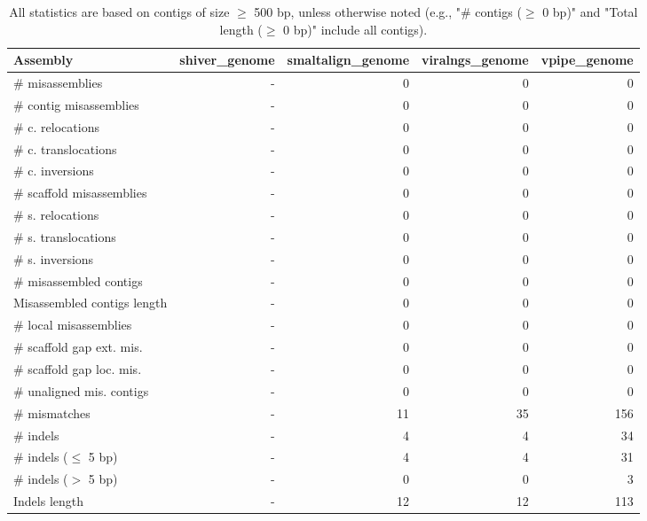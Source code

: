 \documentclass[12pt,a4paper]{article}
\begin{document}
\begin{table}[ht]
\begin{center}
\caption{All statistics are based on contigs of size $\geq$ 500 bp, unless otherwise noted (e.g., "\# contigs ($\geq$ 0 bp)" and "Total length ($\geq$ 0 bp)" include all contigs).}
\begin{tabular}{|l*{4}{|r}|}
\hline
Assembly & shiver\_genome & smaltalign\_genome & viralngs\_genome & vpipe\_genome \\ \hline
\# misassemblies & - & 0 & 0 & 0 \\ \hline
\hspace{2mm}\# contig misassemblies & - & 0 & 0 & 0 \\ \hline
\hspace{5mm}\# c. relocations & - & 0 & 0 & 0 \\ \hline
\hspace{5mm}\# c. translocations & - & 0 & 0 & 0 \\ \hline
\hspace{5mm}\# c. inversions & - & 0 & 0 & 0 \\ \hline
\hspace{2mm}\# scaffold misassemblies & - & 0 & 0 & 0 \\ \hline
\hspace{5mm}\# s. relocations & - & 0 & 0 & 0 \\ \hline
\hspace{5mm}\# s. translocations & - & 0 & 0 & 0 \\ \hline
\hspace{5mm}\# s. inversions & - & 0 & 0 & 0 \\ \hline
\# misassembled contigs & - & 0 & 0 & 0 \\ \hline
Misassembled contigs length & - & 0 & 0 & 0 \\ \hline
\# local misassemblies & - & 0 & 0 & 0 \\ \hline
\# scaffold gap ext. mis. & - & 0 & 0 & 0 \\ \hline
\# scaffold gap loc. mis. & - & 0 & 0 & 0 \\ \hline
\# unaligned mis. contigs & - & 0 & 0 & 0 \\ \hline
\# mismatches & - & 11 & 35 & 156 \\ \hline
\# indels & - & 4 & 4 & 34 \\ \hline
\hspace{5mm}\# indels ($\leq$ 5 bp) & - & 4 & 4 & 31 \\ \hline
\hspace{5mm}\# indels ($>$ 5 bp) & - & 0 & 0 & 3 \\ \hline
Indels length & - & 12 & 12 & 113 \\ \hline
\end{tabular}
\end{center}
\end{table}
\end{document}
